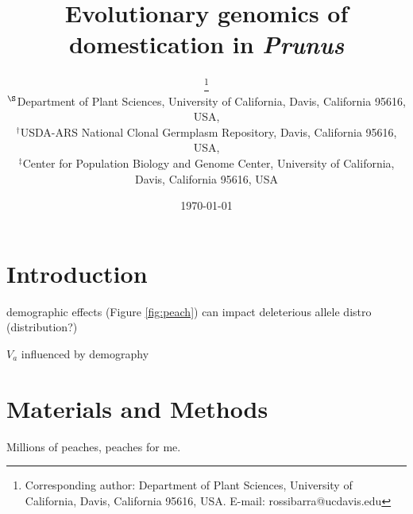 \documentclass[12pt]{article}
\begin{document}
\title{Evolutionary genomics of domestication in \emph{Prunus}}

\author{\small{}\thanks{Corresponding author: Department of Plant Sciences, University of California, Davis, California 95616, USA. E-mail: \mbox{rossibarra@ucdavis.edu}} \\[0.3cm]
     \small\sf $^{\S}$Department of Plant Sciences, University of California, Davis, California 95616, USA,\\
     \small\sf $^{\dag}$USDA-ARS National Clonal Germplasm Repository, Davis, California 95616, USA,\\
     \small\sf $^{\ddag}$Center for Population Biology and Genome Center, University of California, Davis, California 95616, USA}

\date{\today}

\maketitle

\section*{Introduction}

demographic effects (Figure \ref{fig:peach}) can impact deleterious allele distro (distribution?)

$V_a$ influenced by demography \citep{Lohmueller2014}


\section*{Materials and Methods}
Millions of peaches, peaches for me.
\end{document}
